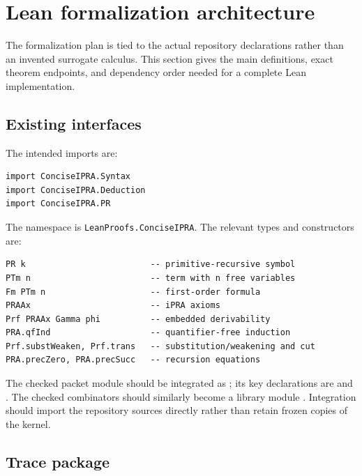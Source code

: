 \section{Lean formalization architecture}
\label{sec:lean}

The formalization plan is tied to the actual repository declarations rather
than an invented surrogate calculus.  This section gives the main definitions,
exact theorem endpoints, and dependency order needed for a complete Lean
implementation.

\subsection{Existing interfaces}

The intended imports are:

\begin{lstlisting}[language={},caption={Repository interfaces used by the compiler}]
import ConciseIPRA.Syntax
import ConciseIPRA.Deduction
import ConciseIPRA.PR
\end{lstlisting}

The namespace is \texttt{LeanProofs.ConciseIPRA}.  The relevant types and
constructors are:

\begin{lstlisting}[language={}]
PR k                         -- primitive-recursive symbol
PTm n                        -- term with n free variables
Fm PTm n                     -- first-order formula
PRAAx                        -- iPRA axioms
Prf PRAAx Gamma phi          -- embedded derivability
PRA.qfInd                    -- quantifier-free induction
Prf.substWeaken, Prf.trans   -- substitution/weakening and cut
PRA.precZero, PRA.precSucc   -- recursion equations
\end{lstlisting}

The checked packet module  should be integrated as
; its key declarations are
 and .  The
checked  combinators should similarly become a
library module .  Integration should import
the repository sources directly rather than retain frozen copies of the
kernel.

\subsection{Trace package}


